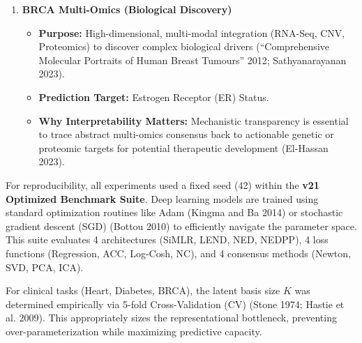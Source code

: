 \documentclass[
  letterpaper,
]{report}
\providecommand{\tightlist}{%
  \setlength{\itemsep}{0pt}\setlength{\parskip}{0pt}}
\begin{document}
\begin{enumerate}
  \begin{itemize}
  \tightlist
  \item
    \textbf{Purpose:} Continuous risk stratification using baseline
    clinical indicators and blood serum measurements (Efron et al.
    2004).
  \item
    \textbf{Prediction Target:} Quantitative measure of disease
    progression one year post-baseline.
  \item
    \textbf{Why Interpretability Matters:} Identifying precise
    directional impacts of specific biomarkers enables personalized
    intervention strategies and provides an auditable trail for medical
    decisions (Thakur 2025; Wachter et al. 2017).
  \end{itemize}
\item
  \textbf{BRCA Multi-Omics (Biological Discovery)}

  \begin{itemize}
  \tightlist
  \item
    \textbf{Purpose:} High-dimensional, multi-modal integration
    (RNA-Seq, CNV, Proteomics) to discover complex biological drivers
    ({``Comprehensive Molecular Portraits of Human Breast Tumours''}
    2012; Sathyanarayanan 2023).
  \item
    \textbf{Prediction Target:} Estrogen Receptor (ER) Status.
  \item
    \textbf{Why Interpretability Matters:} Mechanistic transparency is
    essential to trace abstract multi-omics consensus back to actionable
    genetic or proteomic targets for potential therapeutic development
    (El-Hassan 2023).
  \end{itemize}
\end{enumerate}

For reproducibility, all experiments used a fixed seed (42) within the
\textbf{v21 Optimized Benchmark Suite}. Deep learning models are trained
using standard optimization routines like Adam (Kingma and Ba 2014) or
stochastic gradient descent (SGD) (Bottou 2010) to efficiently navigate
the parameter space. This suite evaluates 4 architectures (SiMLR, LEND,
NED, NEDPP), 4 loss functions (Regression, ACC, Log-Cosh, NC), and 4
consensus methods (Newton, SVD, PCA, ICA).

For clinical tasks (Heart, Diabetes, BRCA), the latent basis size \(K\)
was determined empirically via 5-fold Cross-Validation (CV) (Stone 1974;
Hastie et al. 2009). This appropriately sizes the representational
bottleneck, preventing over-parameterization while maximizing predictive
capacity.
\end{document}
